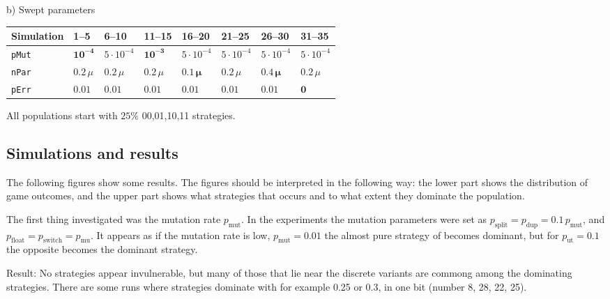 \begin{table}[!hbtp]
  b) Swept parameters\myhalfpar

  \newcommand \temp {$5\cdot 10^{-4}$}
  \begin{tabular}{*{8}{l}}
    Simulation    & 1--5               & 6--10    & 11--15    & 16--20   & 21--25   & 26--30   & 31--35   \\
    \hline
    \texttt{pMut} & $\mathbf{10^{-4}}$ & \temp       & $\mathbf{10^{-3}}$ & \temp       & \temp       & \temp       & \temp       \\
    \texttt{nPar} & $0.2\,\mu$          & $0.2\,\mu$ & $0.2\,\mu$  & $\mathbf{0.1\,\mu}$ & $0.2\,\mu$ & $\mathbf{0.4\,\mu}$ & $0.2\,\mu$ \\
    \texttt{pErr} & $0.01$             & $0.01$   & $0.01$    & $0.01$   & $0.01$   & $0.01$   & $\mathbf{0}$ 
  \end{tabular}
\end{table}

All populations start with $25 \%$ 00,01,10,11 strategies.  %

\subsection{Simulations and results}
The following figures show some results. The figures should be interpreted in the following way: the lower part shows the distribution of game outcomes, and the upper part shows what strategies that occurs and to what extent they dominate the population.

The first thing investigated was the mutation rate $p_{\textrm{mut}}$. In the experiments the mutation parameters were set as $p_{\textrm{split}} = p_{\textrm{dup}} = 0.1\,p_{\textrm{mut}}$, and$ p_{\textrm{float}} = p_{\textrm{switch}} = p_{\textrm{mu}}$. It appears as if the mutation rate is low, $p_{\textrm{mut}}=0.01$ the almost pure strategy of  becomes dominant, but for $p_{\textrm{ut}}=0.1$ the opposite  becomes the dominant strategy.

Result: No strategies appear invulnerable, but many of those that lie
near the discrete variants are commong among the dominating
strategies. There are some runs where strategies dominate with for example 0.25 or
0.3, in one bit (number 8, 28, 22, 25).

